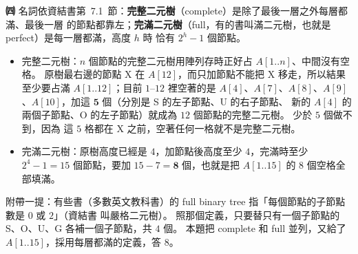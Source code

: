 \begin{pastsoln}
\textbf{㈣} 名詞依資結書第~7.1~節：\textbf{完整二元樹}（complete）是除了最後一層之外每層都滿、最後一層
的節點都靠左；\textbf{完滿二元樹}（full，有的書叫滿二元樹，也就是 perfect）是每一層都滿，高度 $h$ 時
恰有 $2^h - 1$ 個節點。
\begin{itemize}
\item 完整二元樹：$n$ 個節點的完整二元樹用陣列存時正好占 $A[1..n]$、中間沒有空格。 原樹最右邊的節點
X 在 $A[12]$，而只加節點不能把 X 移走，所以結果至少要占滿 $A[1..12]$；目前 $1$--$12$ 裡空著的是
$A[4]$、$A[7]$、$A[8]$、$A[9]$、$A[10]$，加這 $\mathbf{5}$ 個（分別是 S 的左子節點、U 的右子節點、
新的 $A[4]$ 的兩個子節點、O 的左子節點）就成為 $12$ 個節點的完整二元樹。 少於 $5$ 個做不到，因為
這 $5$ 格都在 X 之前，空著任何一格就不是完整二元樹。
\item 完滿二元樹：原樹高度已經是 $4$，加節點後高度至少 $4$，完滿時至少 $2^4 - 1 = 15$ 個節點，要加
$15 - 7 = \mathbf{8}$ 個，也就是把 $A[1..15]$ 的 $8$ 個空格全部填滿。
\end{itemize}
附帶一提：有些書（多數英文教科書）的 full binary tree 指「每個節點的子節點數是 $0$ 或 $2$」（資結書
叫嚴格二元樹）。 照那個定義，只要替只有一個子節點的 S、O、U、G 各補一個子節點，共 $4$ 個。 本題把
complete 和 full 並列，又給了 $A[1..15]$，採用每層都滿的定義，答 $8$。
\end{pastsoln}
